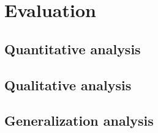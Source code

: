 \chapter{Evaluation}
\label{chapter5}
\thispagestyle{plain}

\section{Quantitative analysis}
\section{Qualitative analysis}
\section{Generalization analysis}